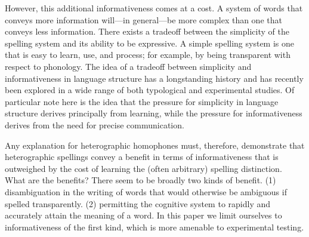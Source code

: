 \documentclass[doc,biblatex]{apa7}
\begin{document}
However, this additional informativeness comes at a cost. A system of words that conveys more information will---in general---be more complex than one that conveys less information. There exists a tradeoff between the simplicity of the spelling system and its ability to be expressive. A simple spelling system is one that is easy to learn, use, and process; for example, by being transparent with respect to phonology. The idea of a tradeoff between simplicity and informativeness in language structure has a longstanding history \parencite{Gabelentz:1891, Zipf:1949, Martinet:1952, Rosch:1978} and has recently been explored in a wide range of both typological \parencite{KempRegier:2012, Kemp:2018} and experimental \parencite{Carr:2020, Kirby:2015} studies. Of particular note here is the idea that the pressure for simplicity in language structure derives principally from learning, while the pressure for informativeness derives from the need for precise communication.

Any explanation for heterographic homophones must, therefore, demonstrate that heterographic spellings convey a benefit in terms of informativeness that is outweighed by the cost of learning the (often arbitrary) spelling distinction. What are the benefits? There seem to be broadly two kinds of benefit. (1) disambiguation in the writing of words that would otherwise be ambiguous if spelled transparently. (2) permitting the cognitive system to rapidly and accurately attain the meaning of a word. In this paper we limit ourselves to informativeness of the first kind, which is more amenable to experimental testing.
\end{document}
